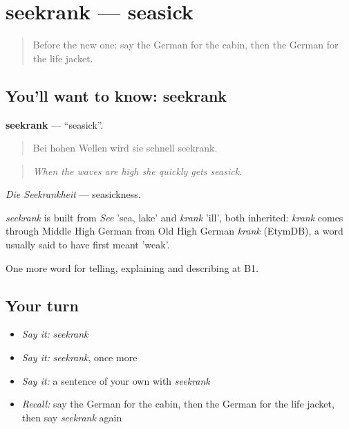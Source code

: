 \section[seekrank]{seekrank — seasick}

\label{lesson:GE-C421-seekrank}



\begin{quote}
Before the new one: say the German for the cabin, then the German for the life jacket.
\end{quote}

\subsection*{You'll want to know: seekrank}
\textbf{seekrank} — \textquotedblleft{}seasick\textquotedblright{}.

\begin{quote}
Bei hohen Wellen wird sie schnell seekrank.
\end{quote}

\begin{quote}
\emph{When the waves are high she quickly gets seasick.}
\end{quote}

\emph{Die Seekrankheit} — seasickness.

\begin{cousinweb}
\emph{seekrank} is built from \emph{See} 'sea, lake' and \emph{krank} 'ill', both inherited: \emph{krank} comes through Middle High German from Old High German \emph{krank} (EtymDB), a word usually said to have first meant 'weak'.
\end{cousinweb}

\begin{grammarlens}[title={What you've built}]
One more word for telling, explaining and describing at B1.
\end{grammarlens}

\subsection*{Your turn}
\begin{itemize}
\raggedright
  \item \emph{Say it:} \emph{seekrank}
  \item \emph{Say it:} \emph{seekrank}, once more
  \item \emph{Say it:} a sentence of your own with \emph{seekrank}
  \item \emph{Recall:} say the German for the cabin, then the German for the life jacket, then say \emph{seekrank} again
\end{itemize}

